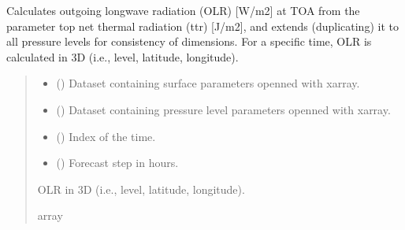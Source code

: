 \documentclass[a4paper,11pt,english]{sphinxmanual}
\begin{document}
\label{\detokenize{modules:module-climaccf.processing_surf_vars}}

\begin{fulllineitems}
\label{\detokenize{modules:climaccf.processing_surf_vars.extend_olr_pl_4d}}
\pysigstartsignatures
{}
\pysigstopsignatures
\sphinxAtStartPar
Calculates outgoing longwave radiation (OLR) {[}W/m2{]} at TOA from the parameter top net thermal radiation (ttr)
{[}J/m2{]}, and extends (duplicating) it to all pressure levels for consistency of dimensions. For a specific time, OLR is calculated in 3D (i.e., level, latitude, longitude).
\begin{quote}\begin{description}
\begin{itemize}
\item {} 
\sphinxAtStartPar
{} () \textendash{} Dataset containing surface parameters openned with xarray.

\item {} 
\sphinxAtStartPar
{} () \textendash{} Dataset containing pressure level parameters openned with xarray.

\item {} 
\sphinxAtStartPar
{} () \textendash{} Index of the time.

\item {} 
\sphinxAtStartPar
{} () \textendash{} Forecast step in hours.

\end{itemize}

\sphinxAtStartPar
OLR in 3D (i.e., level, latitude, longitude).

\sphinxAtStartPar
array

\end{description}\end{quote}

\end{fulllineitems}
\end{document}
